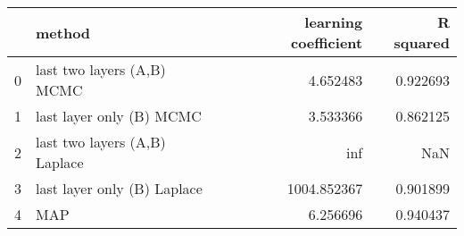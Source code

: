 \begin{tabular}{llrr}
\toprule
{} &                         method &  learning coefficient &  R squared \\
\midrule
0 &     last two layers (A,B) MCMC &              4.652483 &   0.922693 \\
1 &       last layer only (B) MCMC &              3.533366 &   0.862125 \\
2 &  last two layers (A,B) Laplace &                   inf &        NaN \\
3 &    last layer only (B) Laplace &           1004.852367 &   0.901899 \\
4 &                            MAP &              6.256696 &   0.940437 \\
\bottomrule
\end{tabular}
